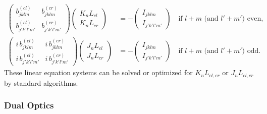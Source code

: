 \begin{equation}    
    \label{eq:linearEqSystemDouble}
    \begin{split}
        \begin{pmatrix}
            b_{jklm}^{(cl)} & b_{jklm}^{(cr)} \\
            b_{j'k'l'm'}^{(cl)} & b_{j'k'l'm'}^{(cr)}
        \end{pmatrix}
        \begin{pmatrix}
            K_{n}L_{cl} \\ 
            K_{n}L_{cr}
        \end{pmatrix}
        &= - 
        \begin{pmatrix}
            I_{jklm} \\ 
            I_{j'k'l'm'} 
        \end{pmatrix}
        \quad \text{if } l + m \text{ (and } l'+m' \text{) even,} \\
        \begin{pmatrix}
            i \, b_{jklm}^{(cl)}     & i \, b_{jklm}^{(cr)} \\
            i \, b_{j'k'l'm'}^{(cl)} & i \, b_{j'k'l'm'}^{(cr)}
        \end{pmatrix}
        \begin{pmatrix}
            J_{n}L_{cl} \\ 
            J_{n}L_{cr}
        \end{pmatrix}
        &= - 
        \begin{pmatrix}
            I_{jklm} \\ 
            I_{j'k'l'm'} 
        \end{pmatrix}
        \quad \text{if } l + m \text{ (and } l'+m' \text{) odd.}
    \end{split}
\end{equation}
These linear equation systems can be solved or optimized for $K_nL_{cl, cr}$ or $J_nL_{cl, cr}$ by standard algorithms.


\subsubsection{Dual Optics} %
\label{sec:DualOptics}



